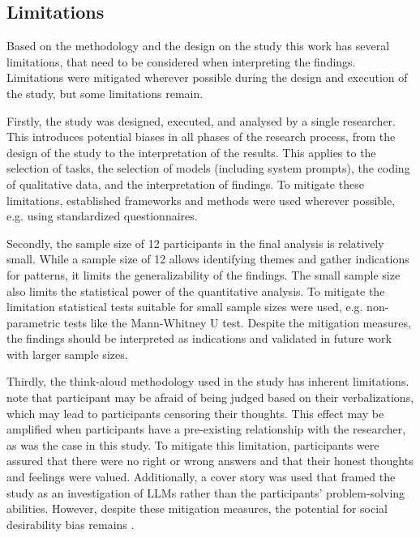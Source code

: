 \subsection{Limitations} \label{ssec:limitations}

Based on the methodology and the design on the study this work has several limitations, that need to be considered when interpreting the findings. Limitations were mitigated wherever possible during the design and execution of the study, but some limitations remain.

Firstly, the study was designed, executed, and analysed by a single researcher. This introduces potential biases in all phases of the research process, from the design of the study to the interpretation of the results. This applies to the selection of tasks, the selection of models (including system prompts), the coding of qualitative data, and the interpretation of findings. To mitigate these limitations, established frameworks and methods were used wherever possible, e.g. using standardized questionnaires.

Secondly, the sample size of 12 participants in the final analysis is relatively small. While a sample size of 12 allows identifying themes and gather indications for patterns, it limits the generalizability of the findings. The small sample size also limits the statistical power of the quantitative analysis. To mitigate the limitation statistical tests suitable for small sample sizes were used, e.g. non-parametric tests like the Mann-Whitney U test. Despite the mitigation measures, the findings should be interpreted as indications and validated in future work with larger sample sizes.

Thirdly, the think-aloud methodology used in the study has inherent limitations. \textcite{VanSomeren1994} note that participant may be afraid of being judged based on their verbalizations, which may lead to participants censoring their thoughts. This effect may be amplified when participants have a pre-existing relationship with the researcher, as was the case in this study. To mitigate this limitation, participants were assured that there were no right or wrong answers and that their honest thoughts and feelings were valued. Additionally, a cover story was used that framed the study as an investigation of \acp{LLM} rather than the participants' problem-solving abilities. However, despite these mitigation measures, the potential for social desirability bias remains \textcite{Krumpal2013}.


